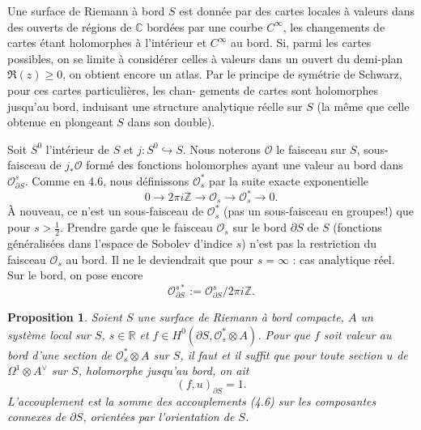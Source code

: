 \documentclass[12pt,a4paper]{article}
\theoremstyle{plain}
\newtheorem{proposition}[theorem]{Proposition}
\theoremstyle{definition}
\theoremstyle{remark}
\newcommand{\cO}{\mathcal{O}}
\newcommand{\Z}{\mathbb{Z}}
\newcommand{\C}{\mathbb{C}}
\newcommand{\R}{\mathbb{R}}
\providecommand{\cO}{\mathcal{O}}
\providecommand{\R}{\mathrm{R}}
\begin{document}
Une surface de Riemann à bord $S$ est donnée par des cartes locales à valeurs
dans des ouverts de régions de $\C$ bordées par une courbe $C^\infty$, les changements de cartes
étant holomorphes à l'intérieur et $C^\infty$ au bord. Si, parmi les cartes possibles, on se limite
à considérer celles à valeurs dans un ouvert du demi-plan $\Re(z) \geq 0$, on obtient encore
un atlas. Par le principe de symétrie de Schwarz, pour ces cartes particulières, les chan-
gements de cartes sont holomorphes jusqu'au bord, induisant une structure analytique
réelle sur $S$ (la même que celle obtenue en plongeant $S$ dans son double).

Soit $S^0$ l'intérieur de $S$ et $j : S^0 \hookrightarrow S$. Nous noterons $\cO$ le faisceau sur $S$, sous-
faisceau de $j_*\cO$ formé des fonctions holomorphes ayant une valeur au bord dans $\cO_{\partial S}^s$.
Comme en 4.6, nous définissons $\cO_s^*$ par la suite exacte exponentielle
\[
0 \to 2\pi i\Z \to \cO_s \to \cO_s^* \to 0.
\]
À nouveau, ce n'est un sous-faisceau de $\cO_s^*$ (pas un sous-faisceau en groupes!) que pour
$s > \tfrac{1}{2}$. Prendre garde que le faisceau $\cO_s$ sur le bord $\partial S$ de $S$ (fonctions généralisées dans
l'espace de Sobolev d'indice $s$) n'est pas la restriction du faisceau $\cO_s$ au bord. Il ne le
deviendrait que pour $s = \infty$ : cas analytique réel. Sur le bord, on pose encore
\[
\cO_{\partial S}^{s*} := \cO_{\partial S}^s / 2\pi i\Z.
\]

\begin{proposition}
Soient $S$ une surface de Riemann à bord compacte, $A$ un système local
sur $S$, $s \in \R$ et $f \in H^0(\partial S, \cO_s^* \otimes A)$. Pour que $f$ soit valeur au bord d'une section de $\cO_s^* \otimes A$ sur $S$,
il faut et il suffit que pour toute section $u$ de $\Omega^1 \otimes A^\vee$ sur $S$, holomorphe jusqu'au bord, on ait
\[
(f, u)_{\partial S} = 1.
\]
L'accouplement est la somme des accouplements \emph{(4.6)} sur les composantes connexes
de $\partial S$, orientées par l'orientation de $S$.
\end{proposition}
\end{document}
